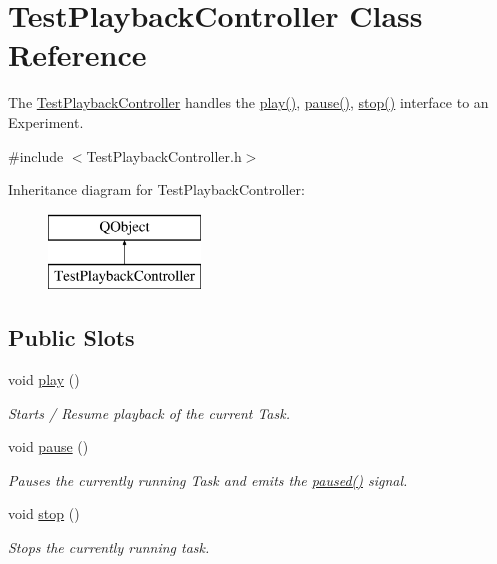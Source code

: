 \hypertarget{class_test_playback_controller}{\section{Test\-Playback\-Controller Class Reference}
\label{class_test_playback_controller}
}


The \hyperlink{class_test_playback_controller}{Test\-Playback\-Controller} handles the \hyperlink{class_test_playback_controller_a169259eb2f0c71d173efdf1b3f00bef3}{play()}, \hyperlink{class_test_playback_controller_a7699c2c9b554951f3d14214c02496b33}{pause()}, \hyperlink{class_test_playback_controller_a6a4a3a56fea5a3639094abc21b5db3ab}{stop()} interface to an Experiment.  




{\ttfamily \#include $<$Test\-Playback\-Controller.\-h$>$}

Inheritance diagram for Test\-Playback\-Controller\-:\begin{figure}[H]
\begin{center}
\leavevmode
\includegraphics[height=2.000000cm]{class_test_playback_controller}
\end{center}
\end{figure}
\subsection*{Public Slots}
\begin{DoxyCompactItemize}
\item 
void \hyperlink{class_test_playback_controller_a169259eb2f0c71d173efdf1b3f00bef3}{play} ()
\begin{DoxyCompactList}\small\item\em Starts / Resume playback of the current Task. \end{DoxyCompactList}\item 
\hypertarget{class_test_playback_controller_a7699c2c9b554951f3d14214c02496b33}{void \hyperlink{class_test_playback_controller_a7699c2c9b554951f3d14214c02496b33}{pause} ()}\label{class_test_playback_controller_a7699c2c9b554951f3d14214c02496b33}

\begin{DoxyCompactList}\small\item\em Pauses the currently running Task and emits the \hyperlink{class_test_playback_controller_aced0e7caa22e3369b6a564917880c9af}{paused()} signal. \end{DoxyCompactList}\item 
void \hyperlink{class_test_playback_controller_a6a4a3a56fea5a3639094abc21b5db3ab}{stop} ()
\begin{DoxyCompactList}\small\item\em Stops the currently running task. \end{DoxyCompactList}\end{DoxyCompactItemize}
